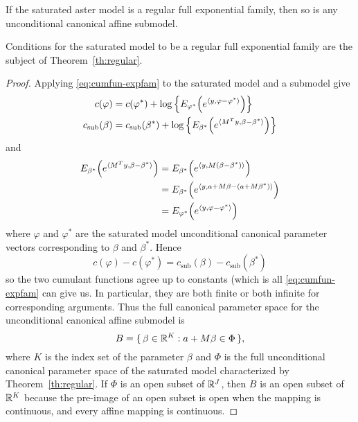 \begin{theorem} \label{th:regular-submodel}
If the saturated aster model is a regular full exponential family,
then so is any unconditional canonical affine submodel.
\end{theorem}
Conditions for the saturated model to be a regular full exponential family
are the subject of Theorem~\ref{th:regular}.
\begin{proof}
Applying \eqref{eq:cumfun-expfam} to the saturated model and a submodel give
\begin{align*}
   c(\varphi)
   & =
   c(\varphi^*) + \log\left\{
   E_{\varphi^*}\Bigl( e^{\langle y, \varphi - \varphi^* \rangle} \Bigr) \right\}
   \\
   c_\text{sub}(\beta)
   & =
   c_\text{sub}(\beta^*) + \log\left\{
   E_{\beta^*}\Bigl( e^{\langle M^T y, \beta - \beta^* \rangle} \Bigr) \right\}
\end{align*}
and
\begin{align*}
   E_{\beta^*}\Bigl( e^{\langle M^T y, \beta - \beta^* \rangle} \Bigr)
   & =
   E_{\beta^*}\Bigl( e^{\langle y, M (\beta - \beta^*) \rangle} \Bigr)
   \\
   & =
   E_{\beta^*}\Bigl( e^{\langle y, a + M \beta - (a + M \beta^*) \rangle} \Bigr)
   \\
   & =
   E_{\varphi^*}\Bigl( e^{\langle y, \varphi - \varphi^* \rangle} \Bigr)
\end{align*}
where $\varphi$ and $\varphi^*$ are the saturated model unconditional
canonical parameter vectors corresponding to $\beta$ and $\beta^*$.
Hence
$$
   c(\varphi) - c(\varphi^*) = c_\text{sub}(\beta) - c_\text{sub}(\beta^*)
$$
so the two cumulant functions agree up to constants
(which is all \eqref{eq:cumfun-expfam} can give us.
In particular, they are both finite or both infinite for corresponding
arguments.  Thus the full canonical parameter space for the unconditional
canonical affine submodel is
$$
   B = \{\,  \beta \in \mathbb{R}^K : a + M \beta \in \Phi  \,\},
$$
where $K$ is the index set of the parameter $\beta$ and $\Phi$ is the
full unconditional canonical parameter space of the saturated model
characterized by Theorem~\ref{th:regular}.  If $\Phi$ is an open subset
of $\mathbb{R}^J$, then $B$ is an open subset of $\mathbb{R}^K$ because the pre-image
of an open subset is open when the mapping is continuous, and every affine
mapping is continuous.
\end{proof}

